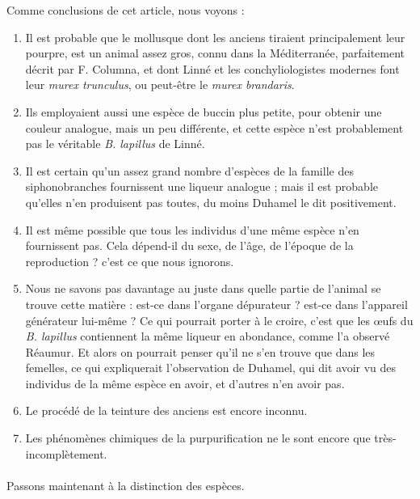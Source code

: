 \documentclass[a4paper, 11pt, oneside, polutonikogreek, french]{article}
\begin{document}
Comme conclusions de cet article, nous voyons :
\begin{enumerate}
    \item Il est probable que le mollusque dont les anciens tiraient principalement leur pourpre, est un animal assez gros, connu dans la Méditerranée, parfaitement décrit par F. Columna, et dont Linné et les conchyliologistes modernes font leur \emph{murex trunculus}, ou peut-être le \emph{murex brandaris}.

    \item Ils employaient aussi une espèce de buccin plus petite, pour obtenir une couleur analogue, mais un peu différente, et cette espèce n'est probablement pas le véritable \emph{B. lapillus} de Linné.

    \item Il est certain qu'un assez grand nombre d'espèces de la famille des siphonobranches fournissent une liqueur analogue ; mais il est probable qu'elles n'en produisent pas toutes, du moins Duhamel le dit positivement.

    \item Il est même possible que tous les individus d'une même espèce n'en fournissent pas. Cela dépend-il du sexe, de l'âge, de l'époque de la reproduction ? c'est ce que nous ignorons.

    \item Nous ne savons pas davantage au juste dans quelle partie de l'animal se trouve cette matière : est-ce dans l'organe dépurateur ? est-ce dans l'appareil générateur lui-même ? Ce qui pourrait porter à le croire, c'est que les œufs du \emph{B. lapillus} contiennent la même liqueur en abondance, comme l'a observé Réaumur. Et alors on pourrait penser qu'il ne s'en trouve que dans les femelles, ce qui expliquerait l'observation de Duhamel, qui dit avoir vu des individus de la même espèce en avoir, et d'autres n'en avoir pas.

    \item Le procédé de la teinture des anciens est encore inconnu.

    \item Les phénomènes chimiques de la purpurification ne le sont encore que très-incomplètement.
\end{enumerate}
\paragraph{}
Passons maintenant à la distinction des espèces.

\bigskip
\end{document}
